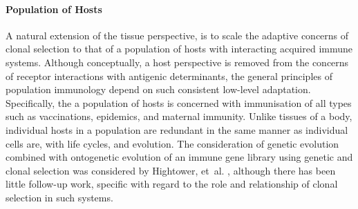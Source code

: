 \paragraph{Population of Hosts}
A natural extension of the tissue perspective, is to scale the adaptive concerns of clonal selection to that of a population of hosts with interacting acquired immune systems. Although conceptually, a host perspective is removed from the concerns of receptor interactions with antigenic determinants, the general principles of population immunology depend on such consistent low-level adaptation. Specifically, the a population of hosts is concerned with immunisation of all types such as vaccinations, epidemics, and maternal immunity. Unlike tissues of a body, individual hosts in a population are redundant in the same manner as individual cells are, with life cycles, and evolution. The consideration of genetic evolution combined with ontogenetic evolution of an immune gene library using genetic and clonal selection was considered by Hightower, et~al. \cite{Hightower1995a, Hightower1995}, although there has been little follow-up work, specific with regard to the role and relationship of clonal selection in such systems.

%
%
